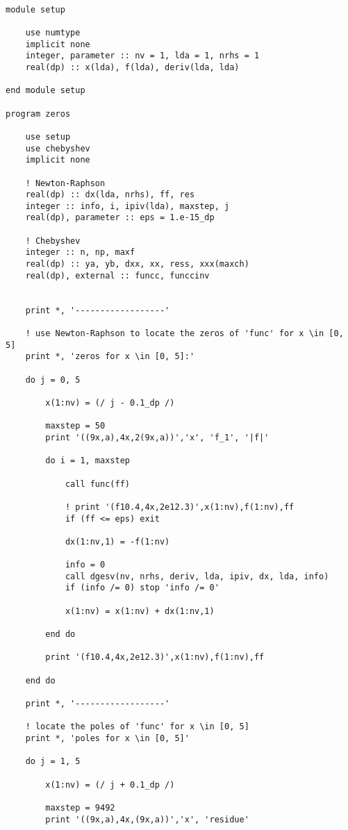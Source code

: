 \documentclass[12pt]{article}
\begin{document}
\begin{lstlisting}[frame=single,caption={{\tt Fortran 90} Code {\tt zeros.f90}},label=zeros]

module setup

    use numtype
    implicit none
    integer, parameter :: nv = 1, lda = 1, nrhs = 1
    real(dp) :: x(lda), f(lda), deriv(lda, lda)

end module setup

program zeros

    use setup
    use chebyshev
    implicit none

    ! Newton-Raphson
    real(dp) :: dx(lda, nrhs), ff, res
    integer :: info, i, ipiv(lda), maxstep, j
    real(dp), parameter :: eps = 1.e-15_dp

    ! Chebyshev
    integer :: n, np, maxf
    real(dp) :: ya, yb, dxx, xx, ress, xxx(maxch)
    real(dp), external :: funcc, funccinv


    print *, '------------------'

    ! use Newton-Raphson to locate the zeros of 'func' for x \in [0, 5]
    print *, 'zeros for x \in [0, 5]:'

    do j = 0, 5

        x(1:nv) = (/ j - 0.1_dp /)

        maxstep = 50
        print '((9x,a),4x,2(9x,a))','x', 'f_1', '|f|'

        do i = 1, maxstep

            call func(ff)

            ! print '(f10.4,4x,2e12.3)',x(1:nv),f(1:nv),ff
            if (ff <= eps) exit

            dx(1:nv,1) = -f(1:nv)

            info = 0
            call dgesv(nv, nrhs, deriv, lda, ipiv, dx, lda, info)
            if (info /= 0) stop 'info /= 0'

            x(1:nv) = x(1:nv) + dx(1:nv,1)

        end do

        print '(f10.4,4x,2e12.3)',x(1:nv),f(1:nv),ff

    end do

    print *, '------------------'

    ! locate the poles of 'func' for x \in [0, 5]
    print *, 'poles for x \in [0, 5]'

    do j = 1, 5

        x(1:nv) = (/ j + 0.1_dp /)

        maxstep = 9492
        print '((9x,a),4x,(9x,a))','x', 'residue'


\end{lstlisting}
\end{document}
